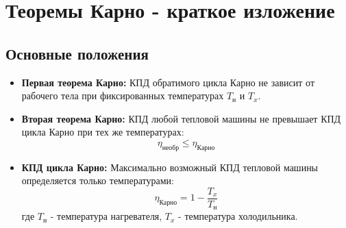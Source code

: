 \documentclass{article}
\begin{document}
\section*{Теоремы Карно - краткое изложение}

\subsection*{Основные положения}
\begin{itemize}
\item \textbf{Первая теорема Карно:} КПД обратимого цикла Карно не зависит от рабочего тела при фиксированных температурах $T_{\text{н}}$ и $T_x$.

\item \textbf{Вторая теорема Карно:} КПД любой тепловой машины не превышает КПД цикла Карно при тех же температурах:
\[
\eta_{\text{необр}} \leq \eta_{\text{Карно}}
\]

\item \textbf{КПД цикла Карно:} Максимально возможный КПД тепловой машины определяется только температурами:
\[
\eta_{\text{Карно}} = 1 - \frac{T_x}{T_{\text{н}}}
\]
где $T_{\text{н}}$ - температура нагревателя, $T_x$ - температура холодильника.
\end{itemize}
\end{document}
